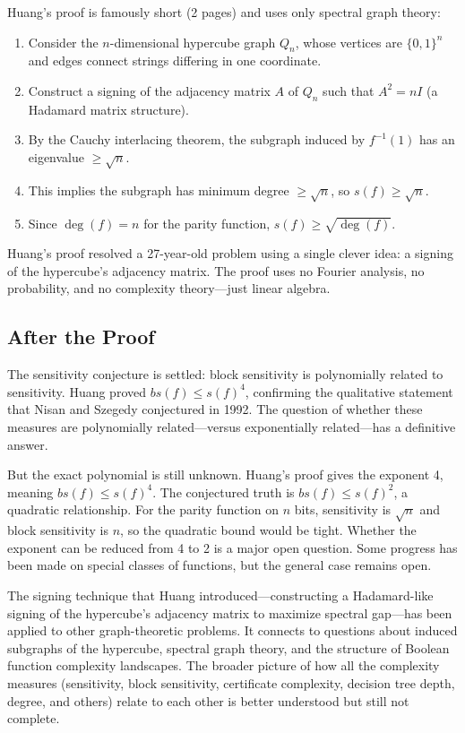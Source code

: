 Huang's proof is famously short (2 pages) and uses only spectral graph theory:

\begin{enumerate}
\item Consider the $n$-dimensional hypercube graph $Q_n$, whose vertices are $\{0,1\}^n$ and edges connect strings differing in one coordinate.
\item Construct a signing of the adjacency matrix $A$ of $Q_n$ such that $A^2 = nI$ (a Hadamard matrix structure).
\item By the Cauchy interlacing theorem, the subgraph induced by $f^{-1}(1)$ has an eigenvalue $\ge \sqrt{n}$.
\item This implies the subgraph has minimum degree $\ge \sqrt{n}$, so $s(f) \ge \sqrt{n}$.
\item Since $\deg(f) = n$ for the parity function, $s(f) \ge \sqrt{\deg(f)}$.
\end{enumerate}

\begin{highlightbox}
Huang's proof resolved a 27-year-old problem using a single clever idea: a signing of the hypercube's adjacency matrix. The proof uses no Fourier analysis, no probability, and no complexity theory---just linear algebra.
\end{highlightbox}

\subsection{After the Proof}

The sensitivity conjecture is settled: block sensitivity is polynomially related to sensitivity. Huang proved $bs(f) \le s(f)^4$, confirming the qualitative statement that Nisan and Szegedy conjectured in 1992. The question of whether these measures are polynomially related---versus exponentially related---has a definitive answer.

But the exact polynomial is still unknown. Huang's proof gives the exponent 4, meaning $bs(f) \le s(f)^4$. The conjectured truth is $bs(f) \le s(f)^2$, a quadratic relationship. For the parity function on $n$ bits, sensitivity is $\sqrt{n}$ and block sensitivity is $n$, so the quadratic bound would be tight. Whether the exponent can be reduced from 4 to 2 is a major open question. Some progress has been made on special classes of functions, but the general case remains open.

The signing technique that Huang introduced---constructing a Hadamard-like signing of the hypercube's adjacency matrix to maximize spectral gap---has been applied to other graph-theoretic problems. It connects to questions about induced subgraphs of the hypercube, spectral graph theory, and the structure of Boolean function complexity landscapes. The broader picture of how all the complexity measures (sensitivity, block sensitivity, certificate complexity, decision tree depth, degree, and others) relate to each other is better understood but still not complete.

